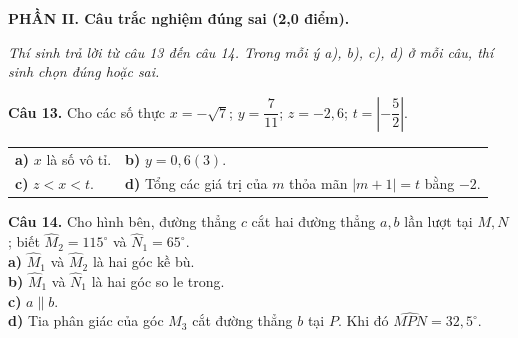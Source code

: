 \documentclass[10.5pt,a4paper]{article}
\begin{document}
\newpage
\noindent\textbf{\large PHẦN II. Câu trắc nghiệm đúng sai (2,0 điểm).}
\vspace{0.5mm}

\noindent\textit{Thí sinh trả lời từ câu 13 đến câu 14. Trong mỗi ý a), b), c), d) ở mỗi câu, thí sinh chọn đúng hoặc sai.}

\vspace{1mm}
\noindent\textbf{Câu 13.} Cho các số thực $x = -\sqrt{7}$; $y = \dfrac{7}{11}$; $z = -2,6$; $t = \left|-\dfrac{5}{2}\right|$.\\
\begin{tabularx}{\linewidth}{X X}
\textbf{a)} $x$ là số vô tỉ. & \textbf{b)} $y = 0,6(3)$. \\
\textbf{c)} $z < x < t$. & \textbf{d)} Tổng các giá trị của $m$ thỏa mãn $|m + 1| = t$ bằng $-2$.
\end{tabularx}

\vspace{1mm}
\noindent
\begin{minipage}[m]{0.65\linewidth}
\textbf{Câu 14.} Cho hình bên, đường thẳng $c$ cắt hai đường thẳng $a, b$ lần lượt tại $M, N$; biết $\widehat{M}_2 = 115^\circ$ và $\widehat{N}_1 = 65^\circ$.\\
\textbf{a)} $\widehat{M}_1$ và $\widehat{M}_2$ là hai góc kề bù.\\
\textbf{b)} $\widehat{M}_1$ và $\widehat{N}_1$ là hai góc so le trong.\\
\textbf{c)} $a \parallel b$.\\
\textbf{d)} Tia phân giác của góc $M_3$ cắt đường thẳng $b$ tại $P$. Khi đó $\widehat{MPN} = 32,5^\circ$.
\end{minipage}
\hfill
\begin{minipage}[m]{0.33\linewidth}
\centering
{}
\end{minipage}
\end{document}
